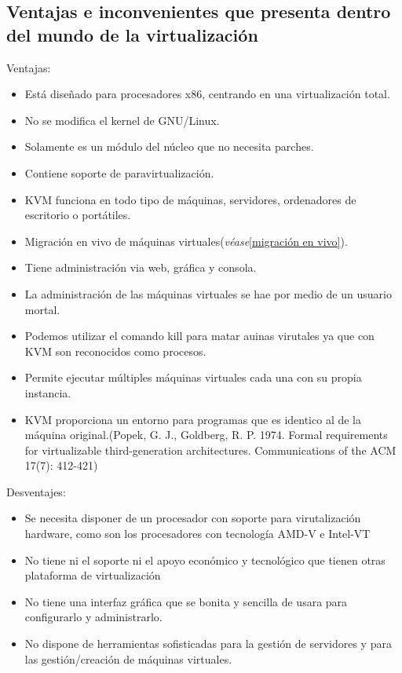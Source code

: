 \documentclass[11pt]{article}
\begin{document}
\subsection{Ventajas e inconvenientes que presenta dentro del mundo de la virtualización}
Ventajas:
\begin{itemize}
\item Está diseñado para procesadores x86, centrando en una virtualización total.
\item No se modifica el kernel de GNU/Linux.
\item Solamente es un módulo del núcleo que no necesita parches.
\item Contiene soporte de paravirtualización.
\item KVM funciona en todo tipo de máquinas, servidores, ordenadores de escritorio o portátiles.
\item Migración en vivo de máquinas virtuales(\textit{véase}\ref{migración en vivo}).
\item Tiene administración via web, gráfica y consola.
\item La administración de las máquinas virtuales se hae por medio de un usuario mortal.
\item Podemos utilizar el comando kill para matar auinas virutales ya que con KVM son reconocidos como procesos.
\item Permite ejecutar múltiples máquinas virtuales cada una con su propia instancia.
\item KVM proporciona un entorno para programas que es identico al de la máquina original.(Popek, G. J., Goldberg, R. P. 1974. Formal requirements for virtualizable third-generation architectures. Communications of the ACM 17(7): 412-421)
\end{itemize}

Desventajes:
\begin{itemize}
\item Se necesita disponer de un procesador con soporte para virutalización hardware, como son los procesadores con tecnología AMD-V e Intel-VT
\item No tiene ni el soporte ni el apoyo económico y tecnológico que tienen otras plataforma de virtualización
\item No tiene una interfaz gráfica que se bonita y sencilla de usara para configurarlo y administrarlo.
\item No dispone de herramientas sofisticadas para la gestión de servidores y para las gestión/creación de máquinas virtuales.
\end{itemize}
\end{document}
